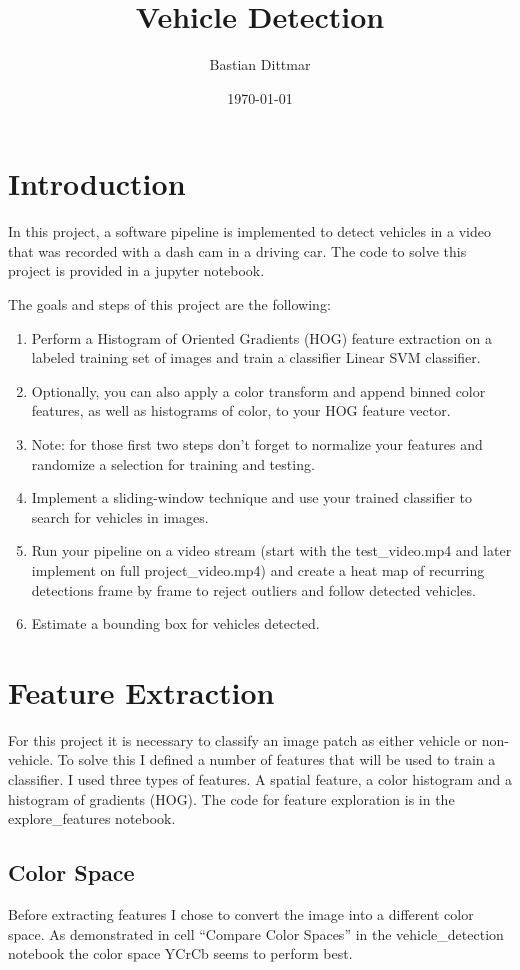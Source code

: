 \documentclass[a4paper, 11pt, DIV=14]{scrartcl}
\author{Bastian Dittmar}
\date{\today}
\title{Vehicle Detection}
\begin{document}
\maketitle


\section{Introduction}
In this project, a software pipeline is implemented to detect vehicles in a video that was recorded with a dash cam in a driving car. The code to solve this project is provided in a jupyter notebook.

The goals and steps of this project are the following:
\begin{enumerate}
\item Perform a Histogram of Oriented Gradients (HOG) feature extraction on a labeled training set of images and train a classifier Linear SVM classifier.
\item Optionally, you can also apply a color transform and append binned color features, as well as histograms of color, to your HOG feature vector.
\item Note: for those first two steps don't forget to normalize your features and randomize a selection for training and testing.
\item Implement a sliding-window technique and use your trained classifier to search for vehicles in images.
\item Run your pipeline on a video stream (start with the test\_video.mp4 and later implement on full project\_video.mp4) and create a heat map of recurring detections frame by frame to reject outliers and follow detected vehicles.
\item Estimate a bounding box for vehicles detected.
\end{enumerate}


\section{Feature Extraction}
For this project it is necessary to classify an image patch as either vehicle or non-vehicle. To solve this I defined a number of features that will be used to train a classifier. I used three types of features. A spatial feature, a color histogram and a histogram of gradients (HOG). The code for feature exploration is in the  explore\_features notebook.

\subsection{Color Space}
Before extracting features I chose to convert the image into a different color space. As demonstrated in cell ``Compare Color Spaces'' in the vehicle\_detection notebook the color space YCrCb seems to perform best.
\end{document}
